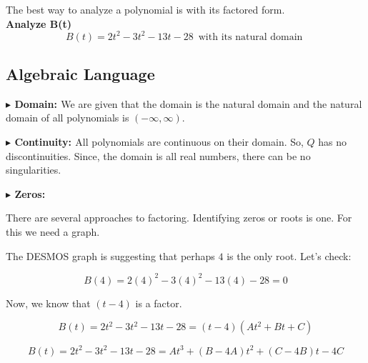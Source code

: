 \documentclass{ximera}
\author{Lee Wayand}
\begin{document}
\begin{exercise}



The best way to analyze a polynomial is with its factored form. \\


\textbf{Analyze B(t)} \\

\[
B(t) = 2 t^2 - 3 t^2 - 13 t - 28 \, \text { with its natural domain } 
\]






\subsection*{Algebraic Language}



\textbf{\textcolor{blue!55!black}{$\blacktriangleright$ Domain: }} We are given that the domain is the natural domain and the natural domain of all polynomials is $(-\infty, \infty)$.


\textbf{\textcolor{blue!55!black}{$\blacktriangleright$ Continuity: }}  All polynomials are continuous on their domain.  So, $Q$ has no discontinuities.  Since, the domain is all real numbers, there can be no singularities.



\textbf{\textcolor{blue!55!black}{$\blacktriangleright$ Zeros: }}  


There are several approaches to factoring.  Identifying zeros or roots is one.  For this we need a graph.




\begin{center}
\end{center}



The DESMOS graph is suggesting that perhaps $4$ is the only root.  Let's check:



\[
B(4) = 2 (4)^2 - 3 (4)^2 - 13 (4) - 28 = 0
\]




Now, we know that $(t-4)$ is a factor.  




\[
B(t) = 2 t^2 - 3 t^2 - 13 t - 28 = (t-4)(A t^2 + B t + C)
\]




\[
B(t) = 2 t^2 - 3 t^2 - 13 t - 28 = A t^3 + (B - 4 A) t^2 + (C - 4 B) t - 4 C 
\]



\end{exercise}
\end{document}
